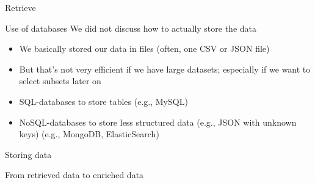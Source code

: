 \begin{frame}{Retrieve}
	\begin{block}{Use of databases \parencite{Guenther2018}}
		We did not discuss how to actually store the data
		\begin{itemize}
			\item We basically stored our data in files (often, one CSV or JSON file)
			\item But that's not very efficient if we have large datasets; especially if we want to select subsets later on
			\item SQL-databases to store tables (e.g., MySQL)
			\item NoSQL-databases to store less structured data (e.g., JSON with unknown keys) (e.g., MongoDB, ElasticSearch)
		\end{itemize}
	\end{block}
\end{frame}





\begin{frame}{Storing data}
\end{frame}




\begin{frame}{From retrieved data to enriched data}
\end{frame}

%
%
%
%
%



